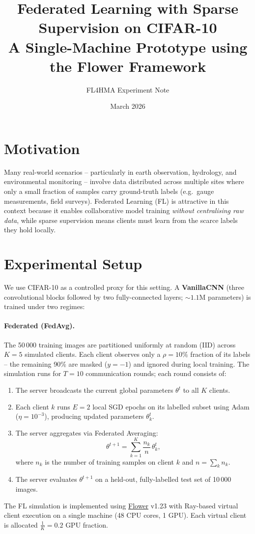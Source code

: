 \documentclass[11pt, a4paper]{article}
\title{\textbf{Federated Learning with Sparse Supervision on CIFAR-10}\\
\large A Single-Machine Prototype using the Flower Framework}
\author{FL4HMA Experiment Note}
\date{March 2026}
\begin{document}
\maketitle

\section*{Motivation}

Many real-world scenarios -- particularly in earth observation, hydrology, and
environmental monitoring -- involve data distributed across multiple sites where
only a small fraction of samples carry ground-truth labels (e.g.\ gauge
measurements, field surveys).  Federated Learning (FL) is attractive in this
context because it enables collaborative model training \emph{without
centralising raw data}, while sparse supervision means clients must learn from
the scarce labels they hold locally.

\section*{Experimental Setup}

We use CIFAR-10 as a controlled proxy for this setting.  A
\textbf{VanillaCNN} (three convolutional blocks followed by two fully-connected
layers; ${\sim}1.1$M parameters) is trained under two regimes:

\paragraph{Federated (FedAvg).}
The 50\,000 training images are partitioned uniformly at random (IID) across
$K = 5$ simulated clients.  Each client observes only a
$\rho = 10\%$ fraction of its labels -- the remaining 90\% are masked
($y = -1$) and ignored during local training.  The simulation runs for
$T = 10$ communication rounds; each round consists of:
\begin{enumerate}
  \item The server broadcasts the current global parameters $\theta^t$ to all
        $K$ clients.
  \item Each client $k$ runs $E = 2$ local SGD epochs on its labelled subset
        using Adam ($\eta = 10^{-3}$), producing updated parameters
        $\theta^t_k$.
  \item The server aggregates via Federated Averaging:
        \[
          \theta^{t+1} = \sum_{k=1}^{K} \frac{n_k}{n} \, \theta^t_k,
        \]
        where $n_k$ is the number of training samples on client $k$ and
        $n = \sum_k n_k$.
  \item The server evaluates $\theta^{t+1}$ on a held-out, fully-labelled test
        set of 10\,000 images.
\end{enumerate}
The FL simulation is implemented using \href{https://flower.ai}{Flower} v1.23
with Ray-based virtual client execution on a single machine (48 CPU cores,
1 GPU).  Each virtual client is allocated $\tfrac{1}{K} = 0.2$ GPU fraction.
\end{document}
